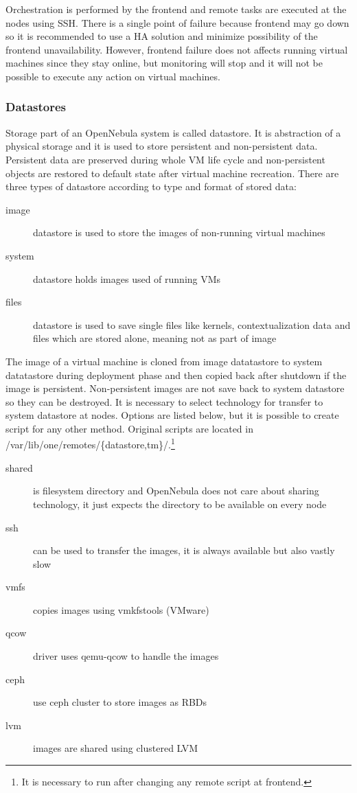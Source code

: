 Orchestration is performed by the frontend and remote tasks are executed at the nodes using \Ac{SSH}. There is a single point of failure because frontend may go down so it is recommended to use a \Ac{HA} solution and minimize possibility of the frontend unavailability. However, frontend failure does not affects running virtual machines since they stay online, but monitoring will stop and it will not be possible to execute any action on virtual machines.

\subsubsection{Datastores}
Storage part of an OpenNebula system is called datastore. It is abstraction of a physical storage and it is used to store persistent and non-persistent data. Persistent data are preserved during whole \Ac{VM} life cycle and non-persistent objects are restored to default state after virtual machine recreation. There are three types of datastore according to type and format of stored data:
\begin{description}
	\item[image] datastore is used to store the images of non-running virtual machines
	\item[system] datastore holds images used of running \Ac{VM}s
	\item[files] datastore is used to save single files like kernels, contextualization data and files which are stored alone, meaning not as part of image
\end{description}

The image of a virtual machine is cloned from image datatastore to system datatastore during deployment phase and then copied back after shutdown if the image is persistent. Non-persistent images are not save back to system datastore so they can be destroyed. It is necessary to select technology for transfer to system datastore at nodes. Options are listed below, but it is possible to create script for any other method. Original scripts are located in /var/lib/one/remotes/\{datastore,tm\}/.\footnote{It is necessary to run  after changing any remote script at frontend.}
\begin{description}
	\item[shared] is filesystem directory and OpenNebula does not care about sharing technology, it just expects the directory to be available on every node
	\item[ssh] can be used to transfer the images, it is always available but also vastly slow
	\item[vmfs] copies images using vmkfstools (VMware)
	\item[qcow] driver uses qemu-qcow to handle the images
	\item[ceph] use ceph cluster to store images as \Ac{RBD}s
	\item[lvm] images are shared using clustered LVM
\end{description}

